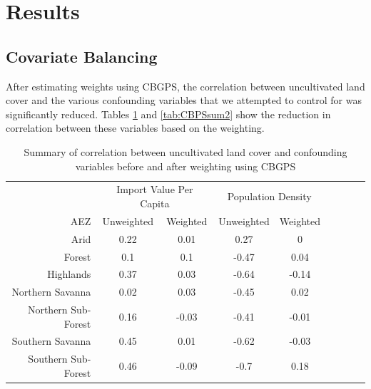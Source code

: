 \documentclass{article}
\begin{document}
\section{Results}
\subsection{Covariate Balancing}
After estimating weights using CBGPS, the correlation between uncultivated land cover and the various confounding variables that we attempted to control for was significantly reduced.  Tables \ref{tab:CBPSsum1} and \ref{tab:CBPSsum2} show the reduction in correlation between these variables based on the weighting.

\begin{table}[h!]
	\begin{center}
		\begin{tabular}{r | c c c c c c c c }
	&	\multicolumn{2}{c}{Import Value Per Capita}			&	\multicolumn{2}{c}{Population Density}			\\
	\cmidrule(lr){2-3}\cmidrule(lr){4-5}
AEZ	&	Unweighted	&	Weighted	&	Unweighted	&	Weighted	\\
\hline									
Arid	&	0.22	&	0.01	&	0.27	&	0	\\
Forest	&	0.1	&	0.1	&	-0.47	&	0.04	\\
Highlands	&	0.37	&	0.03	&	-0.64	&	-0.14	\\
Northern Savanna	&	0.02	&	0.03	&	-0.45	&	0.02	\\
Northern Sub-Forest	&	0.16	&	-0.03	&	-0.41	&	-0.01	\\
Southern Savanna	&	0.45	&	0.01	&	-0.62	&	-0.03	\\
Southern Sub-Forest	&	0.46	&	-0.09	&	-0.7	&	0.18	\\	
		\end{tabular}
	\caption{Summary of correlation between uncultivated land cover and confounding variables before and after weighting using CBGPS}
	\label{tab:CBPSsum1}
	\end{center}
\end{table}
\end{document}
